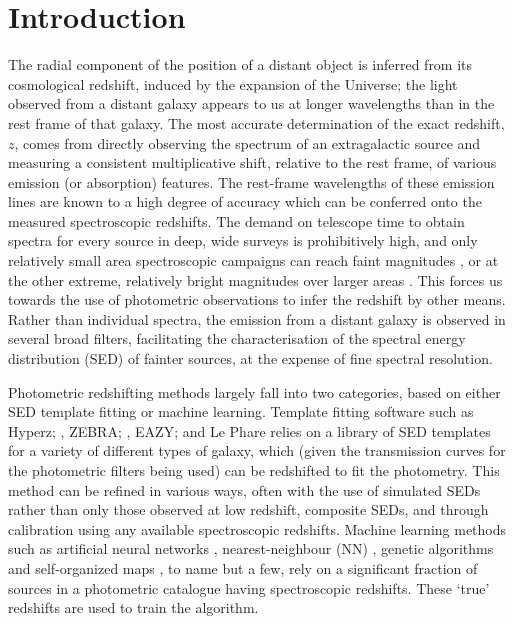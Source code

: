 \documentclass[useAMS,usenatbib,fleqn]{mn2e}
\begin{document}
\section{Introduction}
The radial component of the position of a distant object is inferred from its cosmological redshift, induced by the expansion of the Universe; the light observed from a distant galaxy appears to us at longer wavelengths than in the rest frame of that galaxy. The most accurate determination of the exact redshift, $z$, comes from directly observing the spectrum of an extragalactic source and measuring a consistent multiplicative shift, relative to the rest frame, of various emission (or absorption) features. The rest-frame wavelengths of these emission lines are known to a high degree of accuracy which can be conferred onto the measured spectroscopic redshifts. The demand on telescope time to obtain spectra for every source in deep, wide surveys is prohibitively high, and only relatively small area spectroscopic campaigns can reach faint magnitudes \citep[e.g.][]{Lilly2009,LeFevre2013,LeFevre2015}, or at the other extreme, relatively bright magnitudes over larger areas \citep[e.g.][]{2dfgrs,GAMA,SDSS3}.
This forces us towards the use of photometric observations to infer the redshift by other means. Rather than individual spectra, the emission from a distant galaxy is observed in several broad filters, facilitating the characterisation of the spectral energy distribution (SED) of fainter sources, at the expense of fine spectral resolution.

Photometric redshifting methods largely fall into two categories, based on either SED template fitting or machine learning. Template fitting software such as {\sc Hyperz}; \citep[][]{Hyperz}, {\sc ZEBRA}; \citep{ZEBRA}, {\sc EAZY}; \citep[][]{EAZY} and {\sc Le Phare} \citep[][]{Ilbert2006} relies on a library of SED templates for a variety of different types of galaxy, which (given the transmission curves for the photometric filters being used) can be redshifted to fit the photometry. This method can be refined in various ways, often with the use of simulated SEDs rather than only those observed at low redshift, composite SEDs, and through calibration using any available spectroscopic redshifts. Machine learning methods such as artificial neural networks \citep[e.g. {\sc ANNz};][]{Firth2003,Collister04}, nearest-neighbour (NN) \citep{Ball2008}, genetic algorithms \citep[e.g.][]{Hogan2015} and self-organized maps \citep[][]{Geach2012}, to name but a few, rely on a significant fraction of sources in a photometric catalogue having spectroscopic redshifts. These `true' redshifts are used to train the algorithm. 
\end{document}
